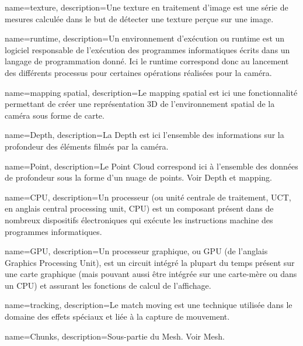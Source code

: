 
{
	name=texture,
	description={Une texture en traitement d'image est une série de mesures calculée dans le but de détecter une texture perçue sur une image.}
}


{
	name=runtime,
	description={Un environnement d'exécution ou runtime est un logiciel responsable de l'exécution des programmes informatiques écrits dans un langage de programmation donné. Ici le runtime correspond donc au lancement des différents processus pour certaines opérations réalisées pour la caméra.}
}

{
	name=mapping spatial,
	description={Le mapping spatial est ici une fonctionnalité permettant de créer une représentation 3D de l'environnement spatial de la caméra sous forme de carte.}
}

{
	name=Depth,
	description={La Depth est ici l'ensemble des informations sur la profondeur des éléments filmés par la caméra.}
}

{
	name=Point,
	description={Le Point Cloud correspond ici à l'ensemble des données de profondeur sous la forme d'un nuage de points. Voir Depth et mapping.}
}



{
	name=CPU,
	description={Un processeur (ou unité centrale de traitement, UCT, en anglais central processing unit, CPU) est un composant présent dans de nombreux dispositifs électroniques qui exécute les instructions machine des programmes informatiques.}
}

{
	name=GPU,
	description={Un processeur graphique, ou GPU (de l'anglais Graphics Processing Unit), est un circuit intégré la plupart du temps présent sur une carte graphique (mais pouvant aussi être intégrée sur une carte-mère ou dans un CPU) et assurant les fonctions de calcul de l'affichage.}
}

{
	name=tracking,
	description={Le match moving est une technique utilisée dans le domaine des effets spéciaux et liée à la capture de mouvement. }
}

{
	name=Chunks,
	description={Sous-partie du Mesh. Voir Mesh.}
}

